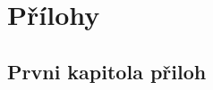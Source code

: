 \documentclass[12pt, a4paper]{article}
\numberwithin{equation}{section} 	%
\begin{document}
\newpage
\section*{Přílohy}
\subsection*{Prvni kapitola přiloh}
\noindent
\end{document}
